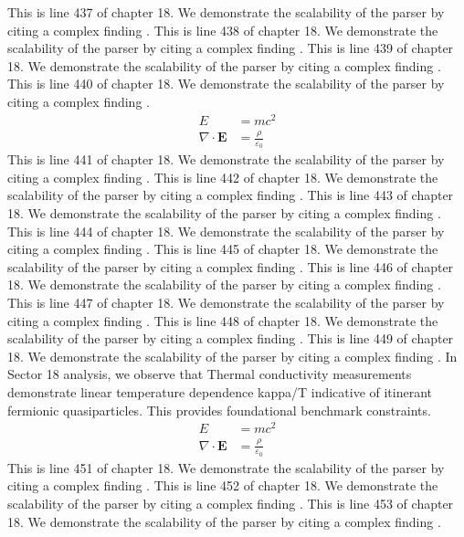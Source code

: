 This is line 437 of chapter 18. We demonstrate the scalability of the parser by citing a complex finding \cite{ref18_437}.
This is line 438 of chapter 18. We demonstrate the scalability of the parser by citing a complex finding \cite{ref18_438}.
This is line 439 of chapter 18. We demonstrate the scalability of the parser by citing a complex finding \cite{ref18_439}.
This is line 440 of chapter 18. We demonstrate the scalability of the parser by citing a complex finding \cite{ref18_440}.
\begin{align*}
  E &= mc^2 \\
  \nabla \cdot \mathbf{E} &= \frac{\rho}{\varepsilon_0}
\end{align*}
This is line 441 of chapter 18. We demonstrate the scalability of the parser by citing a complex finding \cite{ref18_441}.
This is line 442 of chapter 18. We demonstrate the scalability of the parser by citing a complex finding \cite{ref18_442}.
This is line 443 of chapter 18. We demonstrate the scalability of the parser by citing a complex finding \cite{ref18_443}.
This is line 444 of chapter 18. We demonstrate the scalability of the parser by citing a complex finding \cite{ref18_444}.
This is line 445 of chapter 18. We demonstrate the scalability of the parser by citing a complex finding \cite{ref18_445}.
This is line 446 of chapter 18. We demonstrate the scalability of the parser by citing a complex finding \cite{ref18_446}.
This is line 447 of chapter 18. We demonstrate the scalability of the parser by citing a complex finding \cite{ref18_447}.
This is line 448 of chapter 18. We demonstrate the scalability of the parser by citing a complex finding \cite{ref18_448}.
This is line 449 of chapter 18. We demonstrate the scalability of the parser by citing a complex finding \cite{ref18_449}.
In Sector 18 analysis, we observe that Thermal conductivity measurements demonstrate linear temperature dependence kappa/T indicative of itinerant fermionic quasiparticles. This provides foundational benchmark constraints.
\begin{align*}
  E &= mc^2 \\
  \nabla \cdot \mathbf{E} &= \frac{\rho}{\varepsilon_0}
\end{align*}
This is line 451 of chapter 18. We demonstrate the scalability of the parser by citing a complex finding \cite{ref18_451}.
This is line 452 of chapter 18. We demonstrate the scalability of the parser by citing a complex finding \cite{ref18_452}.
This is line 453 of chapter 18. We demonstrate the scalability of the parser by citing a complex finding \cite{ref18_453}.
